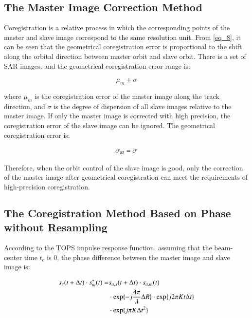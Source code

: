 \documentclass[preprint, authoryear]{elsarticle}
\begin{document}
\subsection{The Master Image Correction Method}

Coregistration is a relative process in which the corresponding points of the master and slave image correspond to the same resolution unit. From \ref{eq_8}, it can be seen that the geometrical coregistration error is proportional to the shift along the orbital direction between master orbit and slave orbit. There is a set of SAR images, and the geometrical coregistration error range is: \par

\begin{equation}
    \mu_m \pm \sigma
    \label{eq_10}
\end{equation}

\noindent where $\mu_m$ is the coregistration error of the master image along the track direction, and $\sigma$ is the degree of dispersion of all slave images relative to the master image. If only the master image is corrected with high precision, the coregistration error of the slave image can be ignored. The geometrical coregistration error is: \par

\begin{equation}
    \sigma_{\rm az} = \sigma
    \label{eq_11}
\end{equation}

\noindent Therefore, when the orbit control of the slave image is good, only the correction of the master image after geometrical coregistration can meet the requirements of high-precision coregistration. \par

\subsection{The Coregistration Method Based on Phase without Resampling}

According to the TOPS impulse response function, assuming that the beam-center time $t_c$ is 0, the phase difference between the master image and slave image is: \par

\begin{equation}
\begin{split}
s_s(t + \Delta t) \cdot s_m^*(t) = & s_{a, s}(t + \Delta t) \cdot s_{a, m}(t)  \\
& \cdot {\rm exp} \{-j \frac{4 \pi}{\lambda} \Delta R\} \cdot {\rm exp} \{j 2 \pi K t \Delta t\} \\
& \cdot {\rm exp} \{ j \pi K \Delta t^2\}
\end{split}
\label{eq_12}
\end{equation}
\end{document}
